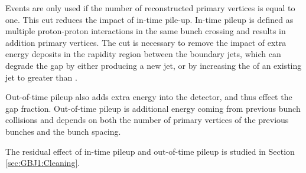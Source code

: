 Events are only used if the number of reconstructed primary vertices is equal to one.
This cut reduces the impact of in-time pile-up. 
In-time pileup is defined as multiple proton-proton interactions in the same bunch crossing and results in addition primary vertices.
The cut is necessary to remove the impact of extra energy deposits in the rapidity region between the boundary jets, which can degrade the gap by either producing a new jet, or by increasing the \pt{} of an existing jet to greater than \qz{}.

Out-of-time pileup also adds extra energy into the detector, and thus effect the gap fraction. 
Out-of-time pileup is additional energy coming from previous bunch collisions and depends on both the number of primary vertices of the previous bunches and the bunch spacing. 

The residual effect of in-time pileup and out-of-time pileup is studied in Section \ref{sec:GBJ1:Cleaning}. 











